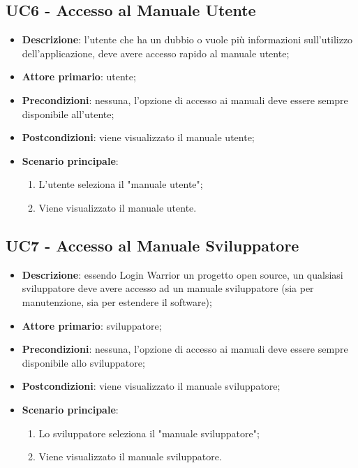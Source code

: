 \subsection{UC6 - Accesso al Manuale Utente}

\begin{itemize}
  \item \textbf{Descrizione}: l'utente che ha un dubbio o vuole più informazioni sull'utilizzo dell'applicazione, deve avere accesso rapido al manuale utente;
  \item \textbf{Attore primario}: utente;
  \item \textbf{Precondizioni}: nessuna, l'opzione di accesso ai manuali deve essere sempre disponibile all'utente;
  \item \textbf{Postcondizioni}: viene visualizzato il manuale utente;
  \item \textbf{Scenario principale}: 
  \begin{enumerate}
    \item L'utente seleziona il "manuale utente";
    \item Viene visualizzato il manuale utente.
  \end{enumerate}
\end{itemize}

\subsection{UC7 - Accesso al Manuale Sviluppatore}

\begin{itemize}
  \item \textbf{Descrizione}: essendo Login Warrior un progetto open source, un qualsiasi sviluppatore deve avere accesso ad un manuale sviluppatore (sia per manutenzione, sia per estendere il software);
  \item \textbf{Attore primario}: sviluppatore;
  \item \textbf{Precondizioni}: nessuna, l'opzione di accesso ai manuali deve essere sempre disponibile allo sviluppatore;
  \item \textbf{Postcondizioni}: viene visualizzato il manuale sviluppatore;
  \item \textbf{Scenario principale}: 
  \begin{enumerate}
    \item Lo sviluppatore seleziona il "manuale sviluppatore";
    \item Viene visualizzato il manuale sviluppatore.
  \end{enumerate}
\end{itemize}

